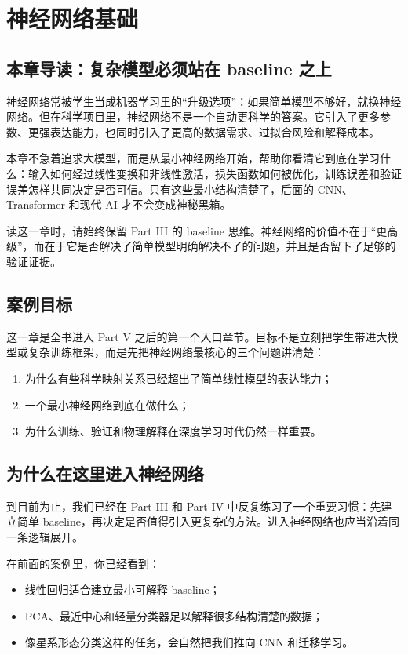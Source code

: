 \chapter{神经网络基础}

\section{本章导读：复杂模型必须站在 baseline 之上}

神经网络常被学生当成机器学习里的“升级选项”：如果简单模型不够好，就换神经网络。但在科学项目里，神经网络不是一个自动更科学的答案。它引入了更多参数、更强表达能力，也同时引入了更高的数据需求、过拟合风险和解释成本。

本章不急着追求大模型，而是从最小神经网络开始，帮助你看清它到底在学习什么：输入如何经过线性变换和非线性激活，损失函数如何被优化，训练误差和验证误差怎样共同决定是否可信。只有这些最小结构清楚了，后面的 CNN、Transformer 和现代 AI 才不会变成神秘黑箱。

读这一章时，请始终保留 Part III 的 baseline 思维。神经网络的价值不在于“更高级”，而在于它是否解决了简单模型明确解决不了的问题，并且是否留下了足够的验证证据。

\section{案例目标}

这一章是全书进入 Part V 之后的第一个入口章节。目标不是立刻把学生带进大模型或复杂训练框架，而是先把神经网络最核心的三个问题讲清楚：

\begin{enumerate}
    \item 为什么有些科学映射关系已经超出了简单线性模型的表达能力；
    \item 一个最小神经网络到底在做什么；
    \item 为什么训练、验证和物理解释在深度学习时代仍然一样重要。
\end{enumerate}

\section{为什么在这里进入神经网络}

到目前为止，我们已经在 Part III 和 Part IV 中反复练习了一个重要习惯：先建立简单 baseline，再决定是否值得引入更复杂的方法。进入神经网络也应当沿着同一条逻辑展开。

在前面的案例里，你已经看到：

\begin{itemize}
    \item 线性回归适合建立最小可解释 baseline；
    \item PCA、最近中心和轻量分类器足以解释很多结构清楚的数据；
    \item 像星系形态分类这样的任务，会自然把我们推向 CNN 和迁移学习。
\end{itemize}

